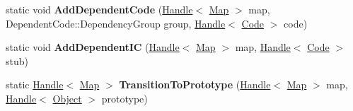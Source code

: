 \begin{DoxyCompactItemize}
\item 
\hypertarget{classv8_1_1internal_1_1_map_a8b239f10d51127577073fa1216150b61}{}static void {\bfseries Add\+Dependent\+Code} (\hyperlink{classv8_1_1internal_1_1_handle}{Handle}$<$ \hyperlink{classv8_1_1internal_1_1_map}{Map} $>$ map, Dependent\+Code\+::\+Dependency\+Group group, \hyperlink{classv8_1_1internal_1_1_handle}{Handle}$<$ \hyperlink{classv8_1_1internal_1_1_code}{Code} $>$ code)\label{classv8_1_1internal_1_1_map_a8b239f10d51127577073fa1216150b61}

\item 
\hypertarget{classv8_1_1internal_1_1_map_ae648abfaa6f257f1225a38644688ba94}{}static void {\bfseries Add\+Dependent\+I\+C} (\hyperlink{classv8_1_1internal_1_1_handle}{Handle}$<$ \hyperlink{classv8_1_1internal_1_1_map}{Map} $>$ map, \hyperlink{classv8_1_1internal_1_1_handle}{Handle}$<$ \hyperlink{classv8_1_1internal_1_1_code}{Code} $>$ stub)\label{classv8_1_1internal_1_1_map_ae648abfaa6f257f1225a38644688ba94}

\item 
\hypertarget{classv8_1_1internal_1_1_map_accc4f7294b69dc2ff87289395b3d5b36}{}static \hyperlink{classv8_1_1internal_1_1_handle}{Handle}$<$ \hyperlink{classv8_1_1internal_1_1_map}{Map} $>$ {\bfseries Transition\+To\+Prototype} (\hyperlink{classv8_1_1internal_1_1_handle}{Handle}$<$ \hyperlink{classv8_1_1internal_1_1_map}{Map} $>$ map, \hyperlink{classv8_1_1internal_1_1_handle}{Handle}$<$ \hyperlink{classv8_1_1internal_1_1_object}{Object} $>$ prototype)\label{classv8_1_1internal_1_1_map_accc4f7294b69dc2ff87289395b3d5b36}

\end{DoxyCompactItemize}
